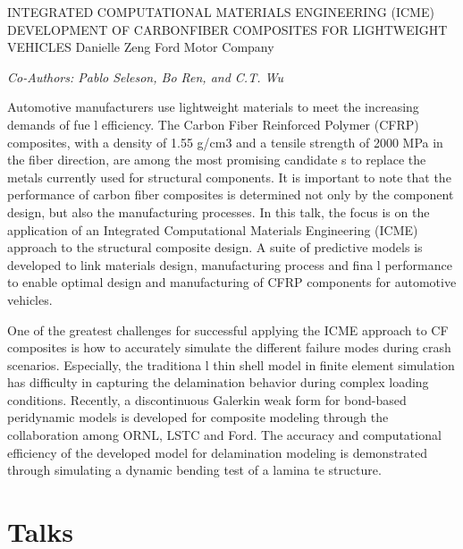 \documentclass[12pt]{book}
\newenvironment{conf-abstract}[4][]{
  \needspace{10\baselineskip}
  \begin{center}
    { \renewcommand\textsuperscript[1]{}
      \phantomsection\addcontentsline{toc}{section}
      {\texorpdfstring{#2 (\emph{#3})}{#2 (#3)}}
    }
    {{\large\bfseries #2}\marginnote{#1}\par}
    \medskip
    {#3\par}
    \smallskip
    {\small #4\par}
  \end{center}
}{%
  \bigskip
  \hrule
  \bigskip
}
\newcommand{\indexauthors}[1]{%
  \forcsvlist{\index}{#1}
}
\begin{document}
\begin{conf-abstract}[26$^{th}$\\???]
{INTEGRATED  COMPUTATIONAL  MATERIALS ENGINEERING  (ICME)  DEVELOPMENT  OF CARBONFIBER COMPOSITES  FOR  LIGHTWEIGHT  VEHICLES}
{Danielle Zeng}
{Ford Motor Company}
\indexauthors{Zeng!Danielle}
\begin{center}
\textit{Co-Authors: Pablo Seleson, Bo Ren, and C.T. Wu}
\end{center}
Automotive   manufacturers  use  lightweight   materials  to  meet  the  increasing   demands  of  fue l efficiency.  The Carbon Fiber  Reinforced  Polymer  (CFRP) composites,  with  a density  of 1.55  g/cm3 and  a tensile  strength  of 2000  MPa in  the fiber  direction,  are among  the most  promising  candidate s  to  replace  the  metals  currently  used  for  structural  components.  It  is  important  to  note  that  the  performance  of  carbon  fiber  composites  is  determined  not  only  by  the  component  design,  but  also the  manufacturing   processes.  In  this   talk,   the  focus  is  on   the  application   of  an  Integrated Computational  Materials  Engineering  (ICME) approach  to  the structural  composite  design.  A suite  of  predictive   models   is  developed   to  link   materials   design,   manufacturing   process  and  fina l performance  to  enable  optimal   design  and  manufacturing   of  CFRP  components  for  automotive  vehicles.

One of the greatest challenges  for successful applying  the ICME approach  to CF composites  is  how  to  accurately simulate  the different  failure  modes  during  crash scenarios.  Especially,  the traditiona l thin  shell  model  in  finite  element  simulation  has  difficulty  in  capturing  the  delamination  behavior during  complex  loading  conditions.  Recently,  a discontinuous  Galerkin  weak form  for bond-based peridynamic  models  is developed  for composite  modeling  through  the collaboration  among  ORNL, LSTC  and   Ford.     The  accuracy  and   computational   efficiency   of  the  developed   model   for delamination   modeling   is  demonstrated  through  simulating   a dynamic  bending  test  of  a  lamina te  structure.
\end{conf-abstract}


\chapter{Talks}

{
\begin{conf-abstract}[\tiny\datum\\\time]
{\title}
{\first~ \last}
{\affiliation}
\indexauthors{\last!\first}

\end{conf-abstract}
}
\end{document}
